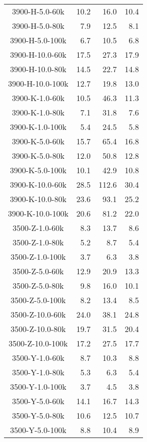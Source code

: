 \begin{longtable}{crrr}
    3900-H-5.0-60k &  10.2 &   16.0 &  10.4 \\
    3900-H-5.0-80k &   7.9 &   12.5 &   8.1 \\
    3900-H-5.0-100k &   6.7 &   10.5 &   6.8 \\
    3900-H-10.0-60k &  17.5 &   27.3 &  17.9 \\
    3900-H-10.0-80k &  14.5 &   22.7 &  14.8 \\
    3900-H-10.0-100k &  12.7 &   19.8 &  13.0 \\
    3900-K-1.0-60k &  10.5 &   46.3 &  11.3 \\
    3900-K-1.0-80k &   7.1 &   31.8 &   7.6 \\
    3900-K-1.0-100k &   5.4 &   24.5 &   5.8 \\
    3900-K-5.0-60k &  15.7 &   65.4 &  16.8 \\
    3900-K-5.0-80k &  12.0 &   50.8 &  12.8 \\
    3900-K-5.0-100k &  10.1 &   42.9 &  10.8 \\
    3900-K-10.0-60k &  28.5 &  112.6 &  30.4 \\
    3900-K-10.0-80k &  23.6 &   93.1 &  25.2 \\
    3900-K-10.0-100k &  20.6 &   81.2 &  22.0 \\
    3500-Z-1.0-60k &   8.3 &   13.7 &   8.6 \\
    3500-Z-1.0-80k &   5.2 &    8.7 &   5.4 \\
    3500-Z-1.0-100k &   3.7 &    6.3 &   3.8 \\
    3500-Z-5.0-60k &  12.9 &   20.9 &  13.3 \\
    3500-Z-5.0-80k &   9.8 &   16.0 &  10.1 \\
    3500-Z-5.0-100k &   8.2 &   13.4 &   8.5 \\
    3500-Z-10.0-60k &  24.0 &   38.1 &  24.8 \\
    3500-Z-10.0-80k &  19.7 &   31.5 &  20.4 \\
    3500-Z-10.0-100k &  17.2 &   27.5 &  17.7 \\
    3500-Y-1.0-60k &   8.7 &   10.3 &   8.8 \\
    3500-Y-1.0-80k &   5.3 &    6.3 &   5.4 \\
    3500-Y-1.0-100k &   3.7 &    4.5 &   3.8 \\
    3500-Y-5.0-60k &  14.1 &   16.7 &  14.3 \\
    3500-Y-5.0-80k &  10.6 &   12.5 &  10.7 \\
    3500-Y-5.0-100k &   8.8 &   10.4 &   8.9 \\

\end{longtable}

